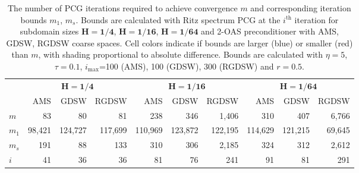 \begin{table}[H]
\centering
\caption{The number of PCG iterations required to achieve convergence $m$ and corresponding iteration bounds $m_1$, $m_s$. Bounds are calculated with Ritz spectrum PCG at the $i^{\textrm{th}}$ iteration for subdomain sizes $\mathbf{H=1/4}$, $\mathbf{H=1/16}$, $\mathbf{H=1/64}$ and 2-OAS preconditioner with AMS, GDSW, RGDSW coarse spaces. Cell colors indicate if bounds are larger (blue) or smaller (red) than $m$, with shading proportional to absolute difference. Bounds are calculated with $\eta=5$, $\tau=0.1$, $i_{\max}$=100 (AMS), 100 (GDSW), 300 (RGDSW) and $r=0.5$.}
\label{tab:cg_iteration_bounds}
\begin{tabular}{lrrrrrrrrr}
\toprule
 & \multicolumn{3}{c}{$\mathbf{H=1/4}$} & \multicolumn{3}{c}{$\mathbf{H=1/16}$} & \multicolumn{3}{c}{$\mathbf{H=1/64}$} \\
 & AMS & GDSW & RGDSW & AMS & GDSW & RGDSW & AMS & GDSW & RGDSW \\
\midrule
$m$ & 83 & 80 & 81 & 238 & 346 & 1,406 & 310 & 407 & 6,766 \\
\cline{1-10}
$m_1$ & {\cellcolor[HTML]{AFC9F6}} \color[HTML]{000000} 98,421 & {\cellcolor[HTML]{AFC9F6}} \color[HTML]{000000} 124,727 & {\cellcolor[HTML]{AFC9F6}} \color[HTML]{000000} 117,699 & {\cellcolor[HTML]{AFC9F6}} \color[HTML]{000000} 110,969 & {\cellcolor[HTML]{7EAFF1}} \color[HTML]{000000} 123,872 & {\cellcolor[HTML]{AFC9F6}} \color[HTML]{000000} 122,195 & {\cellcolor[HTML]{AFC9F6}} \color[HTML]{000000} 114,629 & {\cellcolor[HTML]{7EAFF1}} \color[HTML]{000000} 121,215 & {\cellcolor[HTML]{7EAFF1}} \color[HTML]{000000} 69,645 \\
\cline{1-10}
$m_s$ & {\cellcolor[HTML]{7EAFF1}} \color[HTML]{000000} 191 & {\cellcolor[HTML]{7EAFF1}} \color[HTML]{000000} 88 & {\cellcolor[HTML]{7EAFF1}} \color[HTML]{000000} 133 & {\cellcolor[HTML]{7EAFF1}} \color[HTML]{000000} 310 & {\cellcolor[HTML]{945357}} \color[HTML]{F1F1F1} 306 & {\cellcolor[HTML]{7EAFF1}} \color[HTML]{000000} 2,185 & {\cellcolor[HTML]{7EAFF1}} \color[HTML]{000000} 324 & {\cellcolor[HTML]{945357}} \color[HTML]{F1F1F1} 312 & {\cellcolor[HTML]{945357}} \color[HTML]{F1F1F1} 2,612 \\
\cline{1-10}
$i$ & 41 & 36 & 36 & 81 & 76 & 241 & 91 & 81 & 291 \\
\cline{1-10}
\bottomrule
\end{tabular}
\end{table}
